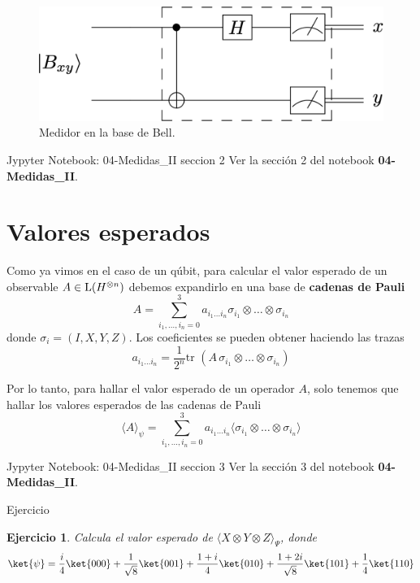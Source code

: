 \documentclass[a4paper,11pt]{book} %
\newtheorem{ejercicio_contador}{Ejercicio}
\newcommand{\Ejercicio}[1]{
		\begin{mybox_gray}{Ejercicio} 
			\begin{ejercicio_contador}
				 #1 
			\end{ejercicio_contador} 
		\end{mybox_gray}
	}
\numberwithin{equation}{chapter}
\begin{document}
	\begin{figure}[H]
	\centering 
	\includegraphics[width=0.4\linewidth]{Figuras/Fig_medidas2_Bell_meter}
	\caption{Medidor en la base de Bell. }
	\label{Fig_medidas2_Bell_meter}
	\end{figure}

	\begin{mybox_orange}{Jypyter Notebook: 04-Medidas\_II seccion 2}
	Ver la sección 2 del notebook \textbf{04-Medidas\_II}.
	\end{mybox_orange}


    \section{Valores esperados}

Como ya vimos en el caso de un qúbit, para calcular el valor esperado de un observable $A\in {\rm L}(H^{\otimes n})$ debemos expandirlo en una base de \textbf{cadenas de Pauli}
	\begin{equation} \label{ec_medidas2_A_en_cadenas_de_Pauli}
	A = \sum_{i_1,...,i_n=0}^3 a_{i_1\ldots i_n} \sigma_{i_1}\otimes \ldots \otimes \sigma_{i_n}
	\end{equation}
donde $\sigma_i = (I,X,Y,Z)$. Los coeficientes se pueden obtener haciendo las trazas
	\begin{equation} \label{ec_medidas2_coef_A_en_cadenas_de_Pauli}
	a_{i_1\ldots i_n} =\frac{1}{2^n} \text{tr } (A \,  \sigma_{i_1}\otimes \ldots  \otimes\sigma_{i_n})
	\end{equation}

Por lo tanto, para hallar el valor esperado de un operador $A$, solo tenemos que hallar los valores esperados de las cadenas de Pauli
	\begin{equation}
	\langle A \rangle_{\psi} =  \sum_{i_1,...,i_n=0}^3 a_{i_1\ldots i_n} \langle \sigma_{i_1}\otimes \ldots   \otimes\sigma_{i_n}\rangle
	\end{equation}

	\begin{mybox_orange}{Jypyter Notebook: 04-Medidas\_II seccion 3}
	Ver la sección 3 del notebook \textbf{04-Medidas\_II}.
	\end{mybox_orange}

	\Ejercicio{Calcula el valor esperado de $\langle X\otimes Y\otimes Z\rangle_\Psi$, donde 
	$$
	\ket{\psi} = \frac{i}{4} \ket{000}+\frac{1}{\sqrt{8}} \ket{001}+\frac{1+i}{4} \ket{010}+
	\frac{1+2i}{\sqrt{8}}\ket{101}+\frac{1}{4} \ket{110}
	$$   }
	
\end{document}
